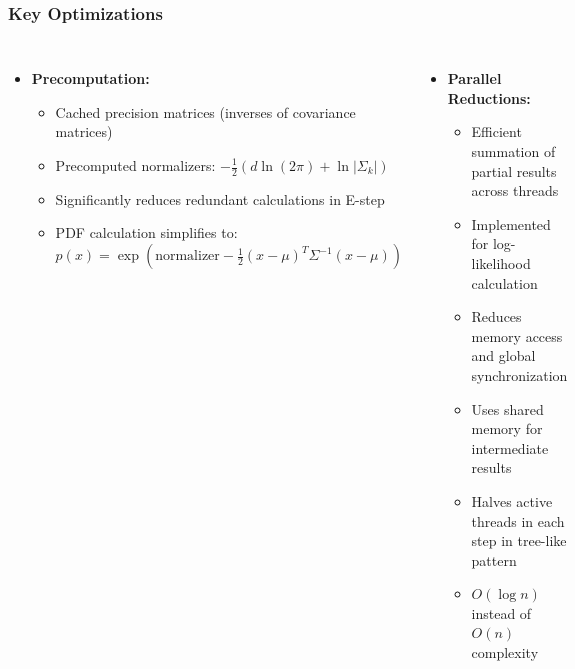 \documentclass{beamer}
\begin{document}
\begin{frame}
    \frametitle{Key Optimizations}
    \begin{columns}
    \begin{itemize}
        \item \textbf{Precomputation:}
        \begin{itemize}
            \item Cached precision matrices (inverses of covariance matrices)
            \item Precomputed normalizers: $-\frac{1}{2}(d \ln(2\pi) + \ln|\Sigma_k|)$
            \item Significantly reduces redundant calculations in E-step
            \item PDF calculation simplifies to:
            $p(x) = \exp(\text{normalizer} - \frac{1}{2}(x-\mu)^T\Sigma^{-1}(x-\mu))$
        \end{itemize}
    \end{itemize}
    \begin{itemize}
        \item \textbf{Parallel Reductions:}
        \begin{itemize}
            \item Efficient summation of partial results across threads
            \item Implemented for log-likelihood calculation
            \item Reduces memory access and global synchronization
            \item Uses shared memory for intermediate results
            \item Halves active threads in each step in tree-like pattern
            \item $O(\log n)$ instead of $O(n)$ complexity
        \end{itemize}
    \end{itemize}
    \end{columns}
    \vspace{0.3cm}
    
\end{frame}
\end{document}
